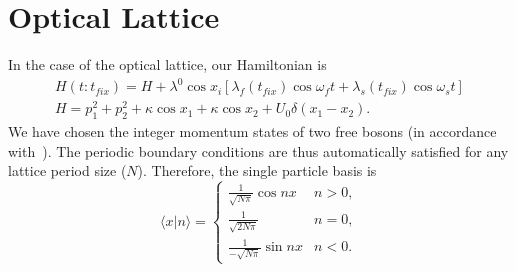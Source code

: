 \section{Optical Lattice}
In the case of the optical lattice, our Hamiltonian is  
\begin{eqnarray}
H(t:t_{fix}) = H + \lambda^0  \cos{x_i} \left[ \lambda_f(t_{fix})\cos{\omega_f t} + \lambda_s(t_{fix}) \cos{\omega_s t}\right]\\
H=p^2_1 + p^2_2+\kappa \cos{x_1}+\kappa \cos{x_2} + U_0 \delta(x_1-x_2).
\label{eq:hamscale:oplattice:appendix}
\end{eqnarray}
We have chosen the integer momentum states of two free bosons (in accordance with~\cite{holder-reichl:avoidedcross}). The periodic boundary conditions are thus automatically satisfied for any lattice period size ($N$). Therefore, the single particle basis is
\begin{equation}
\langle x | n \rangle=\left\{
\begin{array}{lll}
 \frac{1}{\sqrt{N\pi}}\cos{nx} & n>0, \\
 \frac{1}{\sqrt{2N\pi}} & n=0, \\
 \frac{1}{-\sqrt{N\pi}}\sin{nx } & n<0 .
\end{array}
\right.
\label{eq:freeptcl:appendix}
\end{equation}


